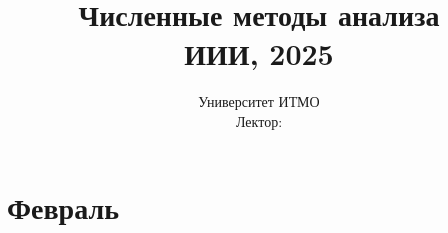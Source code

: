 \documentclass{article}
\author{}
\title{Численные методы анализа\\ИИИ, 2025}
\date{Университет ИТМО \\ Лектор: }
\begin{document}
\maketitle

\tableofcontents

\newpage

\section{Февраль}

\end{document}
